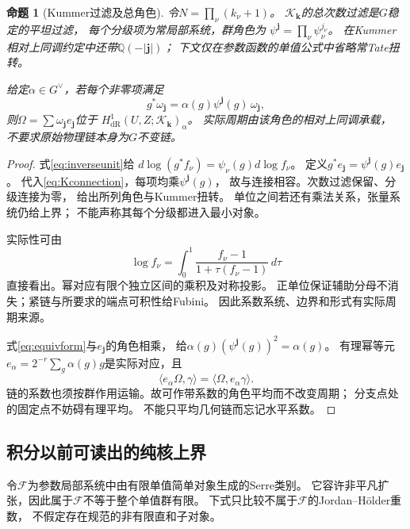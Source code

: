 \documentclass[11pt,a4paper]{ctexart}
\theoremstyle{cnplain}\newtheorem{theorem}{定理}[section]
\newtheorem{proposition}[theorem]{命题}
\theoremstyle{definition}\newtheorem{definition}[theorem]{定义}
\theoremstyle{remark}\newtheorem{remark}[theorem]{注}
\newcommand{\Q}{\mathbb Q}\newcommand{\cC}{\mathcal C}
\begin{document}
\begin{proposition}[Kummer过滤及总角色]\label{prop:eqkummer}
令$N=\prod_\nu(k_\nu+1)$。
$\mathcal K_{\mathbf k}$的总次数过滤是$G$稳定的平坦过滤，
每个分级项为常局部系统，群角色为
$\psi^{\mathbf j}=\prod_\nu\psi_\nu^{j_\nu}$。
在Kummer相对上同调约定中还带$\Q(-|\mathbf j|)$；
下文仅在参数函数的单值公式中省略常Tate扭转。

给定$\alpha\in G^\vee$，若每个非零项满足
\begin{equation}\label{eq:equivform}
 g^*\omega_{\mathbf j}
   =\alpha(g)\psi^{\mathbf j}(g)\,\omega_{\mathbf j},
\end{equation}
则$\Omega=\sum\omega_{\mathbf j}e_{\mathbf j}$位于
$H^1_{\mathrm{dR}}(U,Z;\mathcal K_{\mathbf k})_\alpha$。
实际周期由该角色的相对上同调承载，
不要求原始物理链本身为$G$不变链。
\end{proposition}
\begin{proof}
式\eqref{eq:inverseunit}给
$d\log(g^*f_\nu)=\psi_\nu(g)d\log f_\nu$。
定义$g^*e_{\mathbf j}=\psi^{\mathbf j}(g)e_{\mathbf j}$。
代入\eqref{eq:Kconnection}，每项均乘$\psi^{\mathbf j}(g)$，
故与连接相容。次数过滤保留、分级连接为零，
给出所列角色与Kummer扭转。
单位之间若还有乘法关系，张量系统仍给上界；
不能声称其每个分级都进入最小对象。

实际性可由
\[
 \log f_\nu=\int_0^1
       \frac{f_\nu-1}{1+\tau(f_\nu-1)}\,d\tau
\]
直接看出。幂对应有限个独立区间的乘积及对称投影。
正单位保证辅助分母不消失；紧链与所要求的端点可积性给Fubini。
因此系数系统、边界和形式有实际周期来源。

式\eqref{eq:equivform}与$e_{\mathbf j}$的角色相乘，
给$\alpha(g)(\psi^{\mathbf j}(g))^2=\alpha(g)$。
有理幂等元$e_\alpha=2^{-r}\sum_g\alpha(g)g$是实际对应，且
\[
 \langle e_\alpha\Omega,\gamma\rangle
       =\langle\Omega,e_\alpha\gamma\rangle .
\]
链的系数也须按群作用运输。故可作带系数的角色平均而不改变周期；
分支点处的固定点不妨碍有理平均。
不能只平均几何链而忘记水平系数。
\end{proof}

\subsection{积分以前可读出的纯核上界}
令$\mathcal F$为参数局部系统中由有限单值简单对象生成的Serre类别。
它容许非平凡扩张，因此属于$\mathcal F$不等于整个单值群有限。
下式只比较不属于$\mathcal F$的Jordan--Hölder重数，
不假定存在规范的非有限直和子对象。
\end{document}
